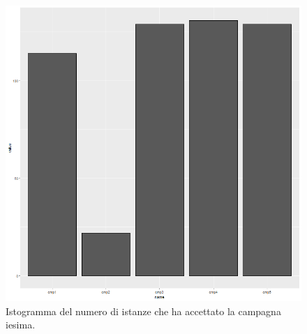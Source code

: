 \documentclass[letterpaper,11pt]{article}
\begin{document}
\begin{figure}[H]
\begin{minipage}[b]{0.4\textwidth}
    \includegraphics[width=\textwidth]{Img/EDA/EDA040.png}
    \caption{Istogramma del numero di istanze che ha accettato la campagna i\-esima.}
    \label{fig:IstogrammaTotalCampaign2}
  \end{minipage}
\end{figure}

\newpage
\end{document}
